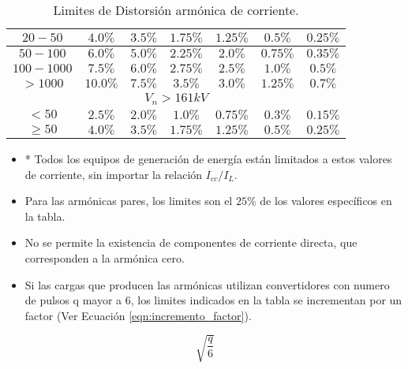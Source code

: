 \begin{table}[H]
\begin{center}
\begin{tabular}{| c | c | c | c | c | c | c |}
 \hline
	$20-50$      &  $4.0\%$  &    $3.5\%$  &        $1.75\%$      &       $1.25\%$       &         $0.5\%$      &    $0.25\%$    \\
 \hline
	$50-100$     &  $6.0\%$  &    $5.0\%$  &        $2.25\%$      &        $2.0\%$       &        $0.75\%$      &    $0.35\%$    \\
 \hline
    $100-1000$   &  $7.5\%$  &    $6.0\%$  &        $2.75\%$      &        $2.5\%$       &         $1.0\%$      &     $0.5\%$    \\
 \hline
    $>1000$      & $10.0\%$  &    $7.5\%$  &         $3.5\%$      &        $3.0\%$       &        $1.25\%$      &     $0.7\%$    \\
 \hline
                                              \multicolumn{7}{|c|}{\textbf{$V_n > 161 kV$}}                                      \\
 \hline
    $< 50$       &  $2.5\%$  &    $2.0\%$  &         $1.0\%$      &       $0.75\%$       &         $0.3\%$      &     $0.15\%$   \\
 \hline
	$\geq 50$    &  $4.0\%$  &    $3.5\%$  &        $1.75\%$      &       $1.25\%$       &         $0.5\%$      &    $0.25\%$    \\
 \hline
\end{tabular}
\caption{Limites de Distorsión armónica de corriente.}
\label{Table:Limites_Distor_Corriente}
\end{center}
\end{table}

\begin{itemize}
    \item * Todos los equipos de generación de energía están limitados a estos valores de corriente, sin importar la relación ${I}_{cc}/I_L$.
    \item Para las armónicas pares, los limites son el $25\%$ de los valores específicos en la tabla.
    \item No se permite la existencia de componentes de corriente directa, que corresponden a la armónica cero.
    \item Si las cargas que producen las armónicas utilizan convertidores con numero de pulsos q mayor a 6, los limites indicados en la tabla se incrementan por un factor (Ver Ecuación \ref{eqn:incremento_factor}). 
\end{itemize}

\begin{equation} \label{eqn:incremento_factor}
    \sqrt{\frac{q}{6}}
\end{equation}

